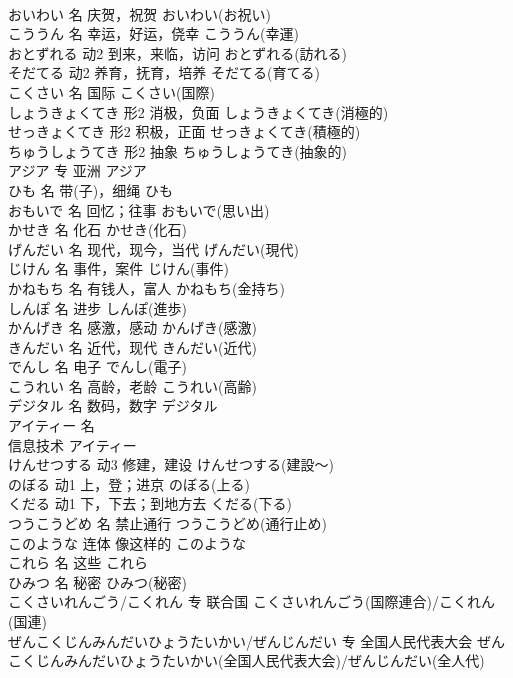\documentclass[8pt]{extreport}
\begin{document}
\begin{CJK}{UTF8}{min}
\\	おいわい	名	庆贺，祝贺	おいわい(お祝い)	
\\	こううん	名	幸运，好运，侥幸	こううん(幸運)	
\\	おとずれる	动2	到来，来临，访问	おとずれる(訪れる)	
\\	そだてる	动2	养育，抚育，培养	そだてる(育てる)	
\\	こくさい	名	国际	こくさい(国際)	
\\	しょうきょくてき	形2	消极，负面	しょうきょくてき(消極的)	
\\	せっきょくてき	形2	积极，正面	せっきょくてき(積極的)	
\\	ちゅうしょうてき	形2	抽象	ちゅうしょうてき(抽象的)	
\\	アジア	专	亚洲	アジア	
\\	ひも	名	带(子)，细绳	ひも	
\\	おもいで	名	回忆；往事	おもいで(思い出)	
\\	かせき	名	化石	かせき(化石)	
\\	げんだい	名	现代，现今，当代	げんだい(現代)	
\\	じけん	名	事件，案件	じけん(事件)	
\\	かねもち	名	有钱人，富人	かねもち(金持ち)	
\\	しんぽ	名	进步	しんぽ(進歩)	
\\	かんげき	名	感激，感动	かんげき(感激)	
\\	きんだい	名	近代，现代	きんだい(近代)	
\\	でんし	名	电子	でんし(電子)	
\\	こうれい	名	高龄，老龄	こうれい(高齢)	
\\	デジタル	名	数码，数字	デジタル	
\\	アイティー	名	
\\	信息技术	アイティー
\\	けんせつする	动3	修建，建设	けんせつする(建設～)	
\\	のぼる	动1	上，登；进京	のぼる(上る)	
\\	くだる	动1	下，下去；到地方去	くだる(下る)	
\\	つうこうどめ	名	禁止通行	つうこうどめ(通行止め)	
\\	このような	连体	像这样的	このような	
\\	これら	名	这些	これら	
\\	ひみつ	名	秘密	ひみつ(秘密)	
\\	こくさいれんごう/こくれん	专	联合国	こくさいれんごう(国際連合)/こくれん(国連)	
\\	ぜんこくじんみんだいひょうたいかい/ぜんじんだい	专	全国人民代表大会	ぜんこくじんみんだいひょうたいかい(全国人民代表大会)/ぜんじんだい(全人代)	

\end{CJK}
\end{document}
